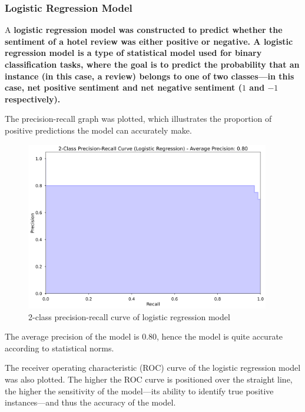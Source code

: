 \documentclass[12pt,bibliography=totocnumbered]{scrartcl}
\begin{document}
\subsubsection{Logistic Regression Model}
A \bf{logistic regression model} was constructed to predict whether the sentiment
of a hotel review was either positive or negative. A logistic regression model
is a type of statistical model used for binary classification tasks, where the goal
is to predict the probability that an instance (in this case, a review) belongs to one of two classes---in
this case, net positive sentiment and net negative sentiment ($1$ and $-1$ respectively).

The precision-recall graph was plotted, which illustrates the proportion of positive
predictions the model can accurately make.

\begin{figure}[htpb]
	\begin{center}
		\includegraphics[width=0.95\textwidth]{../results/rq3/prec-recall_logreg.png}
	\end{center}
	\caption{2-class precision-recall curve of logistic regression model}
	\label{fig:lg-prcurve}
\end{figure}

The average precision of the model is $0.80$, hence the model is quite accurate
according to statistical norms.

The receiver operating characteristic (ROC) curve of the logistic regression model
was also plotted. The higher the ROC curve is positioned over the straight line, the higher
the sensitivity of the model---its ability to identify true positive instances---and
thus the accuracy of the model.
\end{document}

